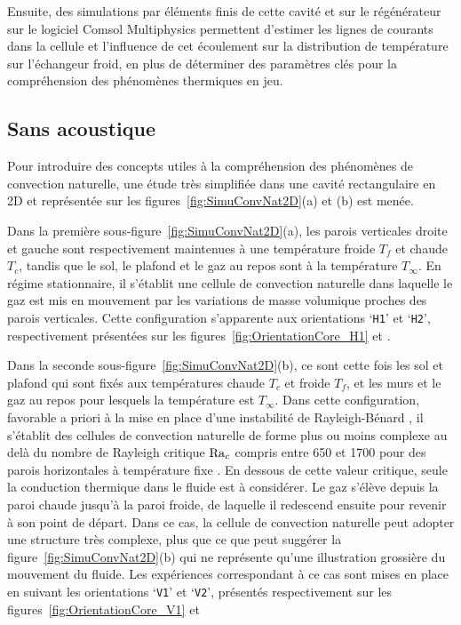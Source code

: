 Ensuite, des simulations par éléments finis de cette cavité et sur le régénérateur sur le logiciel Comsol Multiphysics permettent d'estimer les lignes de courants dans la cellule et l'influence de cet écoulement sur la distribution de température sur l'échangeur froid, en plus de déterminer des paramètres clés pour la compréhension des phénomènes thermiques en jeu.

\subsection{Sans acoustique}
Pour introduire des concepts utiles à la compréhension des phénomènes de convection naturelle, une étude très simplifiée dans une cavité rectangulaire en 2D et représentée sur les figures~\ref{fig:SimuConvNat2D}{\color{MatlabOrange}(a)} et {\color{MatlabOrange}(b)} est menée. 

Dans la première sous-figure~\ref{fig:SimuConvNat2D}{\color{MatlabOrange}(a)}, les parois verticales droite et gauche sont respectivement maintenues à une température froide $T_f$ et chaude $T_c$, tandis que le sol, le plafond et le gaz au repos sont à la température $T_\infty$. En régime stationnaire, il s'établit une cellule de convection naturelle dans laquelle le gaz est mis en mouvement par les  variations de masse volumique proches des parois verticales. Cette configuration s'apparente aux orientations `\texttt{H1}' et `\texttt{H2}', respectivement présentées sur les figures~\ref{fig:OrientationCore_H1} et .

Dans la seconde sous-figure~\ref{fig:SimuConvNat2D}{\color{MatlabOrange}(b)}, ce sont cette fois les sol et plafond qui sont fixés aux températures chaude $T_c$ et froide $T_f$, et les murs et le gaz au repos pour lesquels la température est $T_\infty$. Dans cette configuration, favorable a priori à la mise en place d'une instabilité de \og Rayleigh-Bénard \fg{}, il s'établit des cellules de convection naturelle de forme plus ou moins complexe au delà du nombre de Rayleigh critique $\mathrm{Ra}_c$ compris entre 650 et 1700 pour des parois horizontales à température fixe \cite{getling_rayleigh-benard_1998}. En dessous de cette valeur critique, seule la conduction thermique dans le fluide est à considérer. Le gaz s'élève depuis la paroi chaude jusqu'à la paroi froide, de laquelle il redescend ensuite pour revenir à son point de départ. Dans ce cas, la cellule de convection naturelle peut adopter une structure très complexe, plus que ce que peut suggérer la figure~\ref{fig:SimuConvNat2D}{\color{MatlabOrange}(b)} qui ne représente qu'une illustration grossière du mouvement du fluide. Les expériences correspondant à ce cas sont mises en place en suivant les orientations `\texttt{V1}' et `\texttt{V2}', présentés respectivement sur les figures~\ref{fig:OrientationCore_V1} et 

